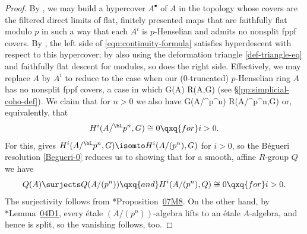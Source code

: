 \begin{proof}
By , we may build a hypercover $A^\bullet$ of $A$ in the topology whose covers are the filtered direct limits of flat, finitely presented maps that are faithfully flat modulo $p$ in such a way that each $A^i$ is $p$-Henselian and admits no nonsplit fppf covers. By , the left side of \eqref{eqn:continuity-formula} satisfies hyperdescent with respect to this hypercover; by also using the deformation triangle \eqref{def-triangle-eq} and faithfully flat descent for modules, so does the right side. %
Effectively, we may replace $A$ by $A^i$ to reduce to the case when our ($0$-truncated) $p$-Henselian ring $A$ has no nonsplit fppf covers, a case in which
\be \label{eqn:dream-cohomology}
G(A) \isomto R\Gamma(A,G)
 \ee
(see \S\ref{pp:simplicial-coho-def}). We claim that for $n > 0$ we also have
\be \label{eqn:mod-pn-desire}
G(A/^\bL p^n) \isomto R\Gamma(A/^\bL p^n,G)
\ee
or, equivalently, that
\[
H^i(A/^\bL p^n,G)\cong0 \qxq{for} i>0.
\]
For this,  gives $H^i(A/^\bL p^n,G) \isomto H^i(A/(p^n),G)$ for $i > 0$, so the B\'{e}gueri resolution \eqref{Begueri-0} reduces us to showing that for a smooth, affine $R$-group $Q$ we have
\[
Q(A) \surjects Q(A/(p^n)) \qxq{and} H^i(A/(p^n), Q) \cong 0 \qxq{for} i > 0.
\]
The surjectivity follows from \cite{SP}*{Proposition~\href{https://stacks.math.columbia.edu/tag/07M8}{07M8}}. On the other hand, by %
\cite{SP}*{Lemma~\href{https://stacks.math.columbia.edu/tag/04D1}{04D1}}, every \'etale $(A/(p^n))$-algebra lifts to an \'{e}tale $A$-algebra, and hence is split, so the vanishing follows, too.


\end{proof}
